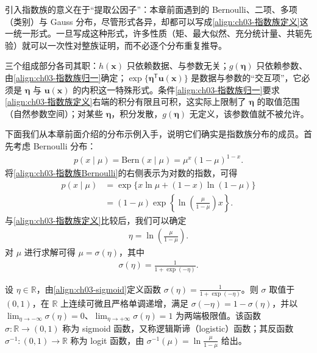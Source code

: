\documentclass[../../main.tex]{subfiles}
\begin{document}
\begin{remark}
引入指数族的意义在于“提取公因子”：本章前面遇到的 Bernoulli、二项、多项（类别）与 Gauss 分布，尽管形式各异，却都可以写成\eqref{align:ch03-指数族定义}这一统一形式。一旦写成这种形式，许多性质（矩、最大似然、充分统计量、共轭先验）就可以一次性对整族证明，而不必逐个分布重复推导。

三个组成部分各司其职：$h(\boldsymbol{x})$ 只依赖数据、与参数无关；$g(\boldsymbol{\eta})$ 只依赖参数、由\eqref{align:ch03-指数族归一}确定；$\exp\{\boldsymbol{\eta}^{\mathsf{T}}\boldsymbol{u}(\boldsymbol{x})\}$ 是数据与参数的“交互项”，它必须是 $\boldsymbol{\eta}$ 与 $\boldsymbol{u}(\boldsymbol{x})$ 的内积这一特殊形式。条件\eqref{align:ch03-指数族归一}要求\eqref{align:ch03-指数族定义}右端的积分有限且可积，这实际上限制了 $\boldsymbol{\eta}$ 的取值范围（自然参数空间）；对某些 $\boldsymbol{\eta}$，积分发散，$g(\boldsymbol{\eta})$ 无定义，该参数值就不被允许。
\end{remark}

下面我们从本章前面介绍的分布示例入手，说明它们确实是指数族分布的成员。首先考虑 Bernoulli 分布：
\begin{align}
p(x\mid\mu)=\mathrm{Bern}(x\mid\mu)=\mu^{x}(1-\mu)^{1-x}.
\label{align:ch03-指数族Bernoulli}
\end{align}
将\eqref{align:ch03-指数族Bernoulli}的右侧表示为对数的指数，可得
\begin{align}
p(x\mid\mu)&=\exp\bigl\{x\ln\mu+(1-x)\ln(1-\mu)\bigr\}\nonumber\\
&=(1-\mu)\exp\left\{\ln\left(\frac{\mu}{1-\mu}\right)x\right\}.
\label{align:ch03-指数族Bernoulli重写}
\end{align}
与\eqref{align:ch03-指数族定义}比较后，我们可以确定
\begin{align}
\eta=\ln\left(\frac{\mu}{1-\mu}\right).
\label{align:ch03-自然参数}
\end{align}
对 $\mu$ 进行求解可得 $\mu=\sigma(\eta)$，其中
\begin{align}
\sigma(\eta)=\frac{1}{1+\exp(-\eta)}.
\label{align:ch03-sigmoid}
\end{align}

\begin{definition}[sigmoid 函数]\label{definition:ch03-sigmoid}
设 $\eta\in\mathbb{R}$，由\eqref{align:ch03-sigmoid}定义函数 $\sigma(\eta)=\frac{1}{1+\exp(-\eta)}$。则 $\sigma$ 取值于 $(0,1)$，在 $\mathbb{R}$ 上连续可微且严格单调递增，满足 $\sigma(-\eta)=1-\sigma(\eta)$，并以 $\lim_{\eta\to-\infty}\sigma(\eta)=0$、$\lim_{\eta\to+\infty}\sigma(\eta)=1$ 为两端极限值。该函数 $\sigma:\mathbb{R}\to(0,1)$ 称为 sigmoid 函数，又称逻辑斯谛（logistic）函数；其反函数 $\sigma^{-1}:(0,1)\to\mathbb{R}$ 称为 logit 函数，由 $\sigma^{-1}(\mu)=\ln\frac{\mu}{1-\mu}$ 给出。
\end{definition}
\end{document}
